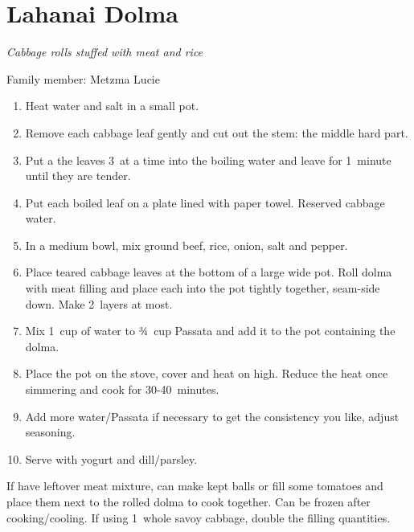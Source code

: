 \chapter{Lahanai Dolma}
\label{ch:lahanai_dolma}



\textit{Cabbage rolls stuffed with meat and rice}

Family member: Metzma Lucie

\begin{enumerate}
    \item Heat water and salt in a small pot.
    \item Remove each cabbage leaf gently and cut out the stem: the middle hard part.
    \item Put a the leaves 3~at a time into the boiling water and leave for 1~minute until they are tender.
    \item Put each boiled leaf on a plate lined with paper towel. Reserved cabbage water.
    \item In a medium bowl, mix ground beef, rice, onion, salt and pepper.
    \item Place teared cabbage leaves at the bottom of a large wide pot. Roll dolma with meat filling and place each into the pot tightly together, seam-side down. Make 2~layers at most.
    \item Mix 1~cup of water to ¾~cup Passata and add it to the pot containing the dolma.
    \item Place the pot on the stove, cover and heat on high. Reduce the heat once simmering and cook for 30-40~minutes.
    \item Add more water/Passata if necessary to get the consistency you like, adjust seasoning.
    \item Serve with yogurt and dill/parsley.
\end{enumerate}

If have leftover meat mixture, can make kept balls or fill some tomatoes and place them next to the rolled dolma to cook together.
Can be frozen after cooking/cooling.
If using 1~whole savoy cabbage, double the filling quantities.
